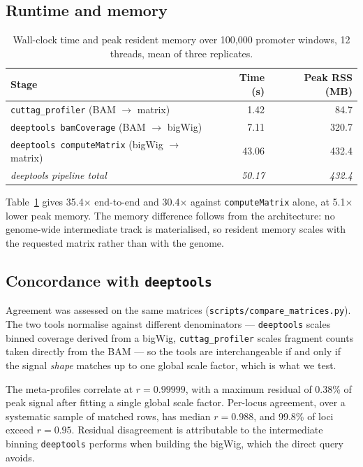 \documentclass[11pt,a4paper]{article}
\newcommand{\NumRegions}{100{,}000}
\newcommand{\NumCores}{12}
\newcommand{\OursTime}{1.42}
\newcommand{\OursMem}{84.7}
\newcommand{\CovTime}{7.11}
\newcommand{\CovMem}{320.7}
\newcommand{\MatTime}{43.06}
\newcommand{\MatMem}{432.4}
\newcommand{\TotalTime}{50.17}
\newcommand{\SpeedupTotal}{35.4}
\newcommand{\SpeedupMatrix}{30.4}
\newcommand{\MemRatio}{5.1}
\newcommand{\ProfileR}{0.99999}
\newcommand{\MaxResidual}{0.38\%}
\newcommand{\MedianRowR}{0.988}
\newcommand{\FracAbove}{99.8\%}
\begin{document}
\subsection{Runtime and memory}

\begin{table}[htbp]
\centering
\caption{Wall-clock time and peak resident memory over \NumRegions{} promoter
windows, \NumCores{} threads, mean of three replicates.}
\label{tab:benchmark}
\begin{tabular}{lrr}
\toprule
Stage & Time (s) & Peak RSS (MB) \\
\midrule
\texttt{cuttag\_profiler} (BAM $\rightarrow$ matrix) & \OursTime & \OursMem \\
\midrule
\texttt{deeptools bamCoverage} (BAM $\rightarrow$ bigWig) & \CovTime & \CovMem \\
\texttt{deeptools computeMatrix} (bigWig $\rightarrow$ matrix) & \MatTime & \MatMem \\
\textit{deeptools pipeline total} & \textit{\TotalTime} & \textit{\MatMem} \\
\bottomrule
\end{tabular}
\end{table}

Table~\ref{tab:benchmark} gives \SpeedupTotal$\times$ end-to-end and
\SpeedupMatrix$\times$ against \texttt{computeMatrix} alone, at
\MemRatio$\times$ lower peak memory. The memory difference follows from the
architecture: no genome-wide intermediate track is materialised, so resident
memory scales with the requested matrix rather than with the genome.

\subsection{Concordance with \texttt{deeptools}}

Agreement was assessed on the same matrices
(\texttt{scripts/compare\_matrices.py}). The two tools normalise against
different denominators --- \texttt{deeptools} scales binned coverage derived
from a bigWig, \texttt{cuttag\_profiler} scales fragment counts taken directly
from the BAM --- so the tools are interchangeable if and only if the signal
\emph{shape} matches up to one global scale factor, which is what we test.

The meta-profiles correlate at $r = \ProfileR$, with a maximum residual of
\MaxResidual{} of peak signal after fitting a single global scale factor.
Per-locus agreement, over a systematic sample of matched rows, has median
$r = \MedianRowR$, and \FracAbove{} of loci exceed $r = 0.95$. Residual
disagreement is attributable to the intermediate binning \texttt{deeptools}
performs when building the bigWig, which the direct query avoids.
\end{document}
